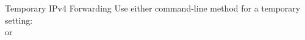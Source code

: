 \begin{frame}{Temporary IPv4 Forwarding}
  Use either command-line method for a temporary setting:
  \vspace{0.35cm}
  \\[0.35cm]
  or\\[0.35cm]
  \\
  \vspace{0.25cm}
\end{frame}
